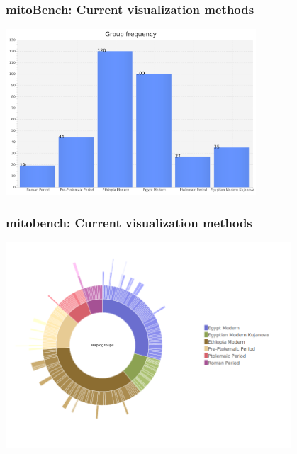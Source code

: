 \documentclass{beamer} %
\begin{document}
\begin{frame}
\frametitle{mitoBench: Current visualization methods}
\begin{center}
	\includegraphics[width=0.7\textwidth]{imagesBench/barchart_group.png}
	\end{center}
\end{frame}



\begin{frame}
	\frametitle{mitobench: Current visualization methods}
	\begin{center}
		\includegraphics[width=0.8\textwidth]{imagesBench/sunburst.png}
	\end{center}
\end{frame}
\end{document}
